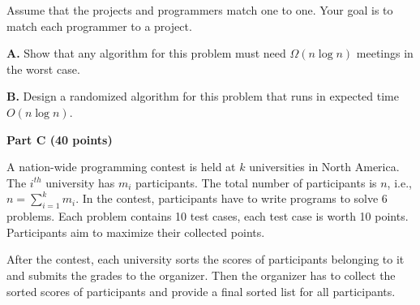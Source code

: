 \documentclass{article}
\begin{document}
Assume that the projects and programmers match one to one. Your goal
is to match each programmer to a project.

{\bf A.} Show that any algorithm for this problem must need $\Omega( n
\log{n} )$ meetings in the worst case.

{\bf B.}  Design a randomized algorithm for this problem that runs in
expected time $O ( n \log{n} )$.

\newpage

\begin{center}
{\bf Part C (40 points)}
\end{center}


 A nation-wide programming contest is held
at $k$ universities in North America. The $i^{th}$ university has
$m_{i}$ participants. The total number of participants is $n$, i.e.,
$n = \sum_{i=1}^{k}m_{i}$. In the contest, participants have to write
programs to solve 6 problems. Each problem contains 10 test cases,
each test case is worth 10 points. Participants aim to maximize their
collected points. 

After the contest, each university sorts the scores of participants
belonging to it and submits the grades to the organizer.  Then the
organizer has to collect the sorted scores of participants and provide
a final sorted list for all participants.
\end{document}
